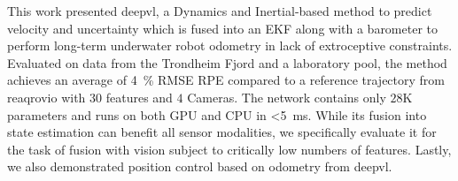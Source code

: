 This work presented \ac{deepvl}, a Dynamics and Inertial-based method to predict velocity and uncertainty which is fused into an EKF along with a barometer to perform long-term underwater robot odometry in lack of extroceptive constraints. Evaluated on data from the Trondheim Fjord and a laboratory pool, the method achieves an average of \SI{4}{\percent} RMSE RPE compared to a reference trajectory from \ac{reaqrovio} with $30$ features and $4$ Cameras. The network contains only $28$K parameters and runs on both GPU and CPU in \SI{<5}{\milli\second}. While its fusion into state estimation can benefit all sensor modalities, we specifically evaluate it for the task of fusion with vision subject to critically low numbers of features. Lastly, we also demonstrated position control based on odometry from \ac{deepvl}.